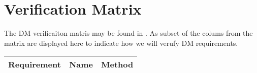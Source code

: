 \section{Verification Matrix} \label{sect:vvm}

The DM verificaiton matris may be found in . As subset of the colums from the matrix are displayed
here to indicate how we will verufy DM requirements. 

\small

\begin{longtable}{|l|p{}|l|}
\hline 
\textbf{Requirement} & \textbf{Name} &\textbf{Method} \\\hline

\end{longtable}

\normalsize
